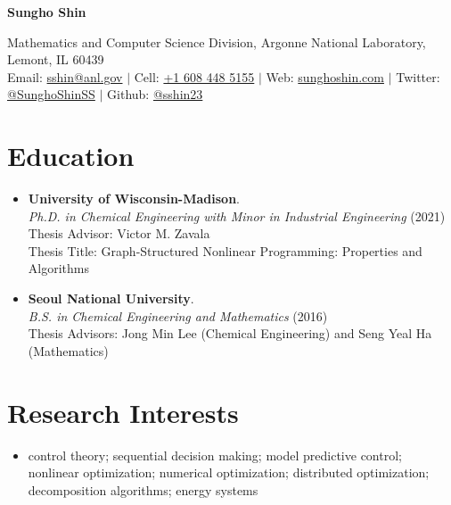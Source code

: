 \documentclass{article}
\begin{document}
\begin{center}
  {\bf\LARGE Sungho Shin}
\end{center}
\begin{center}
  {Mathematics and Computer Science Division}, {Argonne National Laboratory}, Lemont, IL 60439\\
  Email: \href{mailto:sshin@anl.gov}{sshin@anl.gov} $|$ Cell: \href{tel:16084485155}{+1 608 448 5155} $|$ Web: \href{https://sunghoshin.com}{sunghoshin.com} $|$ Twitter: \href{https://twitter.com/SunghoShinSS}{@SunghoShinSS} $|$ Github: \href{https://github.com/sshin23}{@sshin23}
\end{center}

\section*{Education}
\begin{itemize}[leftmargin=*]
\item[]
  {\bf University of Wisconsin-Madison}. \\
  {\it Ph.D. in Chemical Engineering with Minor in Industrial Engineering} (2021)\\
  Thesis Advisor: Victor M. Zavala\\
  Thesis Title: Graph-Structured Nonlinear Programming: Properties and Algorithms
\item[]
  {\bf Seoul National University}. \\
  {\it B.S. in Chemical Engineering and Mathematics} (2016)\\
  Thesis Advisors: Jong Min Lee (Chemical Engineering) and Seng Yeal Ha (Mathematics)\\
\end{itemize}

\section*{Research Interests}
\begin{itemize}[leftmargin=*]
\item[] control theory; sequential decision making; model predictive control; nonlinear optimization; numerical optimization; distributed optimization; decomposition algorithms; energy systems
\end{itemize}
\end{document}
